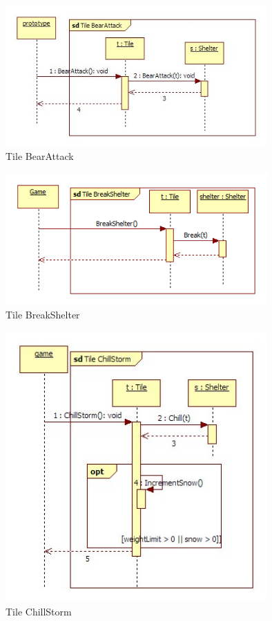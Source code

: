 \begin{figure}[H]
        \begin{center}
                \includegraphics[width=10cm]{chapters/chapter07/seqdiag/Tile_BearAttack.jpg}
                \caption{Tile BearAttack}
                \label{Tile BearAttack}
        \end{center}
\end{figure}
\begin{figure}[H]
        \begin{center}
                \includegraphics[width=10cm]{chapters/chapter07/seqdiag/Tile_BreakShelter.png}
                \caption{Tile BreakShelter}
                \label{Tile BreakShelter}
        \end{center}
\end{figure}
\begin{figure}[H]
        \begin{center}
                \includegraphics[width=10cm]{chapters/chapter07/seqdiag/Tile_ChillStorm.jpg}
                \caption{Tile ChillStorm}
                \label{Tile ChillStorm}
        \end{center}
\end{figure}

